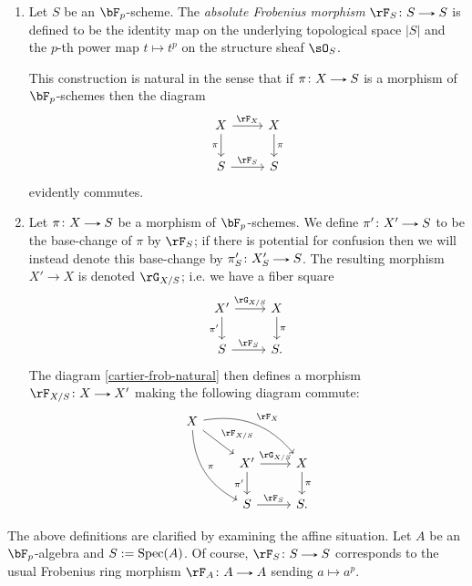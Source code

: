 \begin{definition}
  \label{cartier-frob}
  \begin{enumerate}[leftmargin=*]
  \item Let $S$ be an $\bF_p$-scheme. The \emph{absolute Frobenius morphism} $\rF_S \c S \to S$ is defined to be the identity map on the underlying topological space $|S|$ and the $p$-th power map $t \mapsto t^p$ on the structure sheaf $\sO_S$.

    This construction is natural in the sense that if  $\pi \c X \to S$ is a morphism of $\bF_p$-schemes then the diagram
    \begin{equation}
      \label{cartier-frob-natural}
      \begin{tikzcd}
        X \ar[r, "\rF_X"] \ar[d, "\pi", swap] &
        X \ar[d, "\pi"] \\
        S \ar[r, "\rF_S"] &
        S
      \end{tikzcd}
    \end{equation}
    evidently commutes.

  \item Let $\pi \c X \to S$ be a morphism of $\bF_p$-schemes. We define $\pi' \c X' \to S$ to be the base-change of $\pi$ by $\rF_S$; if there is potential for confusion then we will instead denote this base-change by $\pi'_S \c X'_S \to S$. The resulting morphism $X' \to X$ is denoted $\rG_{X/S}$; i.e. we have a fiber square
    \[
      \begin{tikzcd}
        X' \ar[r, "\rG_{X/S}"] \ar[d, "\pi'", swap] &
        X \ar[d, "\pi"] \\
        S \ar[r, "\rF_S"] &
        S.
      \end{tikzcd}      
    \]
    The diagram \cref{cartier-frob-natural} then defines a morphism $\rF_{X/S} \c X \to X'$ making the following diagram commute:
    \[
      \begin{tikzcd}
        X \ar[rd, "\rF_{X/S}"] \ar[rrd, "\rF_X", bend left] \ar[rdd, "\pi", bend right] &
        &
        \\
        &
        X' \ar[r, "\rG_{X/S}"] \ar[d, "\pi'", swap] &
        X \ar[d, "\pi"] \\
        &
        S \ar[r, "\rF_S"] &
        S.
      \end{tikzcd}      
    \]
  \end{enumerate}

  \begin{subexample}
    \label{cartier-frob-affine}
    The above definitions are clarified by examining the affine situation. Let $A$ be an $\bF_p$-algebra and $S \mathrel{:=} \operatorname{Spec}(A)$. Of course, $\rF_S \c S \to S$ corresponds to the usual Frobenius ring morphism $\rF_A \c A \to A$ sending $a \mapsto a^p$.


\end{subexample}
\end{definition}
